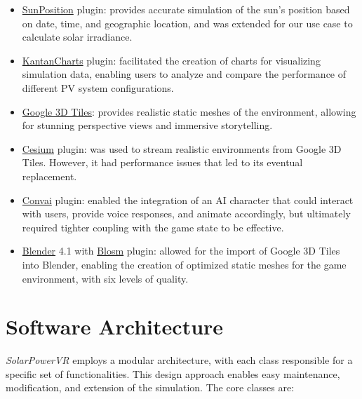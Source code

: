 \documentclass[draft, final]{vutinfth} %
\begin{document}
\begin{itemize}
    \item \href{https://dev.epicgames.com/documentation/en-us/unreal-engine/geographically-accurate-sun-positioning-tool-in-unreal-engine?application_version=5.4}{SunPosition} plugin: provides accurate simulation of the sun's position based on date, time, and geographic location, and was extended for our use case to calculate solar irradiance.
    \item \href{https://github.com/kamrann/KantanCharts}{KantanCharts} plugin: facilitated the creation of charts for visualizing simulation data, enabling users to analyze and compare the performance of different PV system configurations.
    \item \href{https://developers.google.com/maps/documentation/tile/3d-tiles-overview}{Google 3D Tiles}: provides realistic static meshes of the environment, allowing for stunning perspective views and immersive storytelling.
    \item \href{https://cesium.com/platform/cesium-for-unreal/}{Cesium} plugin: was used to stream realistic environments from Google 3D Tiles. However, it had performance issues that led to its eventual replacement.
    \item \href{https://www.unrealengine.com/marketplace/en-US/product/convai}{Convai} plugin: enabled the integration of an AI character that could interact with users, provide voice responses, and animate accordingly, but ultimately required tighter coupling with the game state to be effective.
    \item \href{https://www.blender.org/}{Blender} 4.1 with \href{https://prochitecture.gumroad.com/l/blender-osm}{Blosm} plugin: allowed for the import of Google 3D Tiles into Blender, enabling the creation of optimized static meshes for the game environment, with six levels of quality.
\end{itemize}

\section{Software Architecture}

\textit{SolarPowerVR} employs a modular architecture, with each class responsible for a specific set of functionalities. This design approach enables easy maintenance, modification, and extension of the simulation. The core classes are:
\end{document}
